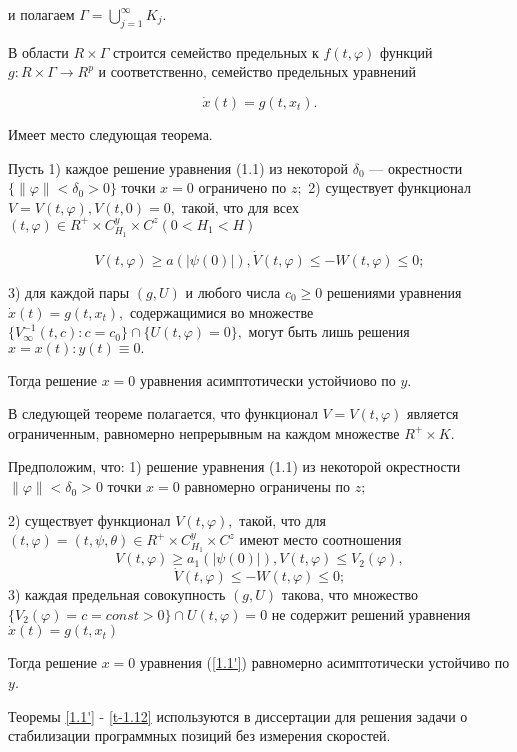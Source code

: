 		и полагаем $ \Gamma = \bigcup\limits_{j=1}^{\infty } {K_j}.$
		
		В области $R \times \Gamma$ строится семейство предельных к $f(t, \varphi)$ функций $g : R \times \Gamma \to R^p$ и соответственно, семейство предельных уравнений
		
		\begin{equation}
		\dot x(t) = g(t, x_t).
		\end{equation}
		
		Имеет место следующая теорема.
		
		\begin{theorem}\label{t-1.11} Пусть 
			1) каждое решение уравнения (1.1) из некоторой $\delta_0$ --- окрестности $ \{ \| \varphi \| < \delta_0 > 0 \}$ точки $x = 0$ ограничено по $z;$
			2) существует функционал $V = V(t, \varphi), V(t, 0) = 0,$ такой, что для всех $ (t, \varphi) \in R^+ \times C^y_{H_1} \times C^z (0 < H_1 < H)$
			
			\begin{equation}
			V(t, \varphi) \ge a(| \psi(0) |), \dot V (t, \varphi) \le - W(t, \varphi) \le 0;
			\end{equation}
			
			3) для каждой пары $ (g, U) $ и любого числа $c_0 \ge 0$ решениями уравнения $\dot x(t) = g(t, x_t), $ содержащимися во множестве $ \lbrace V_{\infty}^{-1}(t, c) : c = c_0 \rbrace \cap \lbrace U(t, \varphi) = 0 \rbrace, $ могут быть лишь решения $x = x(t) : y(t) \equiv 0.$
			
			Тогда решение $x = 0$ уравнения асимптотически устойчиово по $y.$
			
		\end{theorem}
		
		В следующей теореме полагается, что функционал $V = V(t, \varphi)$ является ограниченным, равномерно непрерывным на каждом множестве $R^+ \times K.$ 
		
		\begin{theorem}\label{t-1.12} Предположим, что: 
			1) решение уравнения (1.1) из некоторой окрестности ${\| \varphi \| < \delta_0 > 0}$ точки $x = 0$ равномерно ограничены по $z;$
			
			2) существует функционал $V(t, \varphi), $ такой, что для $(t, \varphi) = (t, \psi, \theta) \in R^+ \times C^y_{H_1} \times C^z$ имеют место соотношения
			$$V(t, \varphi) \ge a_1(| \psi(0) |), V(t, \varphi) \le V_2(\varphi),$$
			$$ \dot V(t, \varphi) \le - W(t, \varphi) \le 0;$$
			3) каждая предельная совокупность $(g, U)$ такова, что множество $ \lbrace V_2(\varphi) = c = const > 0 \rbrace \cap {U(t, \varphi) = 0}$ не содержит решений уравнения $\dot x(t) = g(t, x_t)$
			
			Тогда решение $x = 0$ уравнения (\ref{1.1'}) равномерно асимптотически устойчиво по $y$.			
			
		\end{theorem}

		Теоремы \ref{1.1'} - \ref{t-1.12} используются в диссертации для решения задачи о стабилизации программных позиций без измерения скоростей.